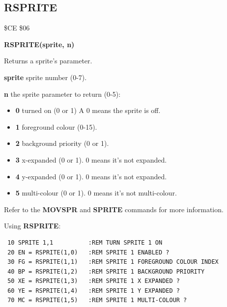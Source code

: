 \subsection{RSPRITE}
\begin{description}[leftmargin=2cm,style=nextline]
\item [Token:] \$CE \$06
\item [Format:] {\bf RSPRITE(sprite, n)}
\item [Usage:]  Returns a sprite's parameter.

                {\bf sprite} sprite number (0-7).

                {\bf n} the sprite parameter to return (0-5):

                \begin{itemize}
                    \item {\bf 0} turned on (0 or 1) A 0 means the sprite is off.
                    \item {\bf 1} foreground colour (0-15).
                    \item {\bf 2} background priority (0 or 1).
                    \item {\bf 3} x-expanded (0 or 1). 0 means it's not expanded.
                    \item {\bf 4} y-expanded (0 or 1). 0 means it's not expanded.
                    \item {\bf 5} multi-colour (0 or 1).  0 means it's not multi-colour.
                \end{itemize}

\item [Remarks:] Refer to the {\bf MOVSPR} and {\bf SPRITE} commands for more information.

\item [Example:] Using {\bf RSPRITE}:
\begin{tcolorbox}[colback=black,coltext=white]
\verbatimfont{\codefont}
\begin{verbatim}
 10 SPRITE 1,1          :REM TURN SPRITE 1 ON
 20 EN = RSPRITE(1,0)   :REM SPRITE 1 ENABLED ?
 30 FG = RSPRITE(1,1)   :REM SPRITE 1 FOREGROUND COLOUR INDEX
 40 BP = RSPRITE(1,2)   :REM SPRITE 1 BACKGROUND PRIORITY
 50 XE = RSPRITE(1,3)   :REM SPRITE 1 X EXPANDED ?
 60 YE = RSPRITE(1,4)   :REM SPRITE 1 Y EXPANDED ?
 70 MC = RSPRITE(1,5)   :REM SPRITE 1 MULTI-COLOUR ?
\end{verbatim}
\end{tcolorbox}
\end{description}



